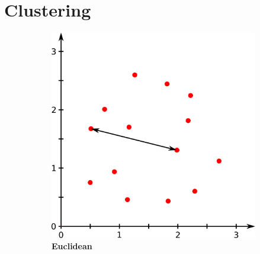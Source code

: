 \section{Clustering} \label{sec:3.1}

\blindtext

\begin{figure}
    \caption[A figure]{\textbf{A figure.} A figure.}
    \label{fig:3.1.1}
    
    \begin{adjustbox}{minipage=\dimexpr{}\fboxrule,fbox}
        \begin{subfigure}[b]{0.45\textwidth}
            \includegraphics[width=\textwidth]{Extra_Graphics/Euclidean.pdf}
            \caption[Euclidean]{\textbf{Euclidean}}
            \label{fig:1.0.2a}
        \end{subfigure}
        \hfill
        \begin{subfigure}[b]{0.45\textwidth}

\end{subfigure}
\end{adjustbox}
\end{figure}

